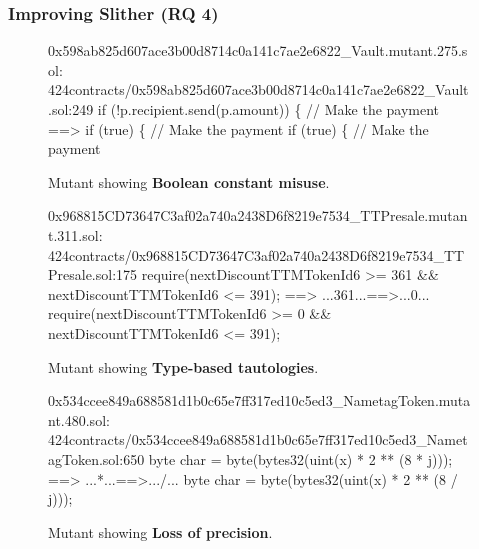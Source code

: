 \subsubsection{Improving Slither {\bf (RQ 4)}}


\begin{figure}
  {\scriptsize
\begin{code}
  0x598ab825d607ace3b00d8714c0a141c7ae2e6822\_Vault.mutant.275.sol:
  424contracts/0x598ab825d607ace3b00d8714c0a141c7ae2e6822\_Vault.sol:249
        if (!p.recipient.send(p.amount)) \{  // Make the payment
 ==>          if (true) \{  // Make the payment
        if (true) \{  // Make the payment
      \end{code}
      }
      \caption{Mutant showing {\bf Boolean constant misuse}.}
      \label{fig:boolean}
    \end{figure}

    \begin{figure}
      {\scriptsize
\begin{code}
  0x968815CD73647C3af02a740a2438D6f8219e7534\_TTPresale.mutant.311.sol:
  424contracts/0x968815CD73647C3af02a740a2438D6f8219e7534\_TTPresale.sol:175
        require(nextDiscountTTMTokenId6 >= 361 \&\& nextDiscountTTMTokenId6 <= 391);
 ==>  ...361...==>...0...
        require(nextDiscountTTMTokenId6 >= 0 \&\& nextDiscountTTMTokenId6 <= 391);
      \end{code}
      }
      \caption{Mutant showing {\bf Type-based tautologies}.}
      \label{fig:tautology}      
\end{figure}

\begin{figure}
  {\scriptsize
\begin{code}
  0x534ccee849a688581d1b0c65e7ff317ed10c5ed3\_NametagToken.mutant.480.sol:
  424contracts/0x534ccee849a688581d1b0c65e7ff317ed10c5ed3\_NametagToken.sol:650
        byte char = byte(bytes32(uint(x) * 2 ** (8 * j)));
 ==>  ...*...==>.../...
        byte char = byte(bytes32(uint(x) * 2 ** (8 / j)));
      \end{code}
      }
      \caption{Mutant showing {\bf Loss of precision}.}
      \label{fig:divmul}            
      \end{figure}


